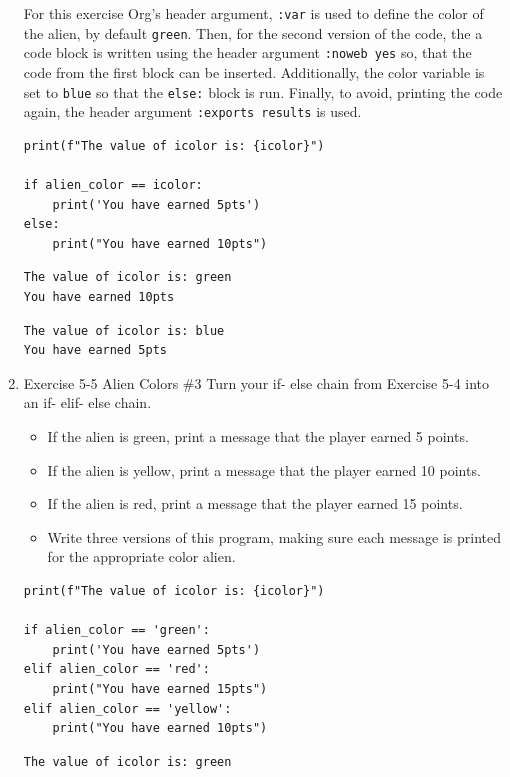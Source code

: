 \documentclass[10pt]{book}
\begin{document}
\begin{enumerate}
For this exercise Org's header argument, \texttt{:var} is used to define the color of the alien, by default \texttt{green}. Then, for the second version of the code, the a code block is written using the header argument \texttt{:noweb yes} so, that the code from the first block can be inserted. Additionally, the color variable is set to \texttt{blue} so that the \texttt{else:} block is run. Finally, to avoid, printing the code again, the header argument \texttt{:exports results} is used.

\begin{verbatim}
print(f"The value of icolor is: {icolor}")

if alien_color == icolor:
    print('You have earned 5pts')
else:
    print("You have earned 10pts")
\end{verbatim}

\label{orgb218eb6}
\begin{verbatim}
The value of icolor is: green
You have earned 10pts
\end{verbatim}

\label{orgb836684}
\begin{verbatim}
The value of icolor is: blue
You have earned 5pts
\end{verbatim}
\item Exercise 5-5 Alien Colors \#3
\label{sec:org84dae36}
Turn your if- else chain from Exercise 5-4 into an if- elif- else chain. 
\begin{itemize}
\item If the alien is green, print a message that the player earned 5 points.
\item If the alien is yellow, print a message that the player earned 10 points.
\item If the alien is red, print a message that the player earned 15 points.
\item Write three versions of this program, making sure each message is printed for the appropriate color alien.
\end{itemize}

\begin{verbatim}
print(f"The value of icolor is: {icolor}")

if alien_color == 'green':
    print('You have earned 5pts')
elif alien_color == 'red':
    print("You have earned 15pts")
elif alien_color == 'yellow':
    print("You have earned 10pts")
\end{verbatim}

\label{org86c3c82}
\begin{verbatim}
The value of icolor is: green
\end{verbatim}


\end{enumerate}
\end{document}
